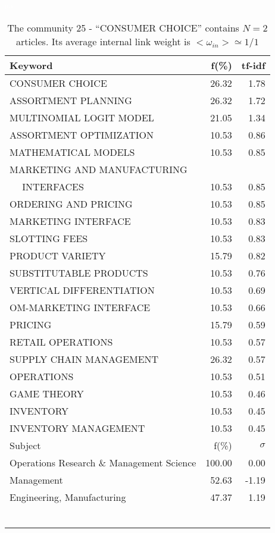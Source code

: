 \documentclass[a4paper,11pt]{report}
\begin{document}
\begin{landscape}
\begin{table}[!ht]
\caption{The community 25 - ``CONSUMER CHOICE'' contains $N = 2$ articles. Its average internal link weight is $<\omega_{in}> \simeq 1/1$ }
\textcolor{white}{aa}\\
{\scriptsize\begin{tabular}{|l r  r|}
\hline
Keyword & f(\%) & tf-idf \\
\hline
CONSUMER CHOICE & 26.32 & 1.78\\
ASSORTMENT PLANNING & 26.32 & 1.72\\
MULTINOMIAL LOGIT MODEL & 21.05 & 1.34\\
ASSORTMENT OPTIMIZATION & 10.53 & 0.86\\
MATHEMATICAL MODELS & 10.53 & 0.85\\
MARKETING AND MANUFACTURING &  &\\
$\quad$ INTERFACES & 10.53 & 0.85\\
ORDERING AND PRICING & 10.53 & 0.85\\
MARKETING INTERFACE & 10.53 & 0.83\\
SLOTTING FEES & 10.53 & 0.83\\
PRODUCT VARIETY & 15.79 & 0.82\\
SUBSTITUTABLE PRODUCTS & 10.53 & 0.76\\
VERTICAL DIFFERENTIATION & 10.53 & 0.69\\
OM-MARKETING INTERFACE & 10.53 & 0.66\\
PRICING & 15.79 & 0.59\\
RETAIL OPERATIONS & 10.53 & 0.57\\
SUPPLY CHAIN MANAGEMENT & 26.32 & 0.57\\
OPERATIONS & 10.53 & 0.51\\
GAME THEORY & 10.53 & 0.46\\
INVENTORY & 10.53 & 0.45\\
INVENTORY MANAGEMENT & 10.53 & 0.45\\
\hline
\hline
Subject & f(\%) & $\sigma$\\
\hline
Operations Research \& Management Science & 100.00 & 0.00\\
Management & 52.63 & -1.19\\
Engineering, Manufacturing & 47.37 & 1.19\\
 &  & \\
 &  & \\
 &  & \\
 &  & \\
 &  & \\
 &  & \\

\end{tabular}}
\end{table}
\end{landscape}
\end{document}
